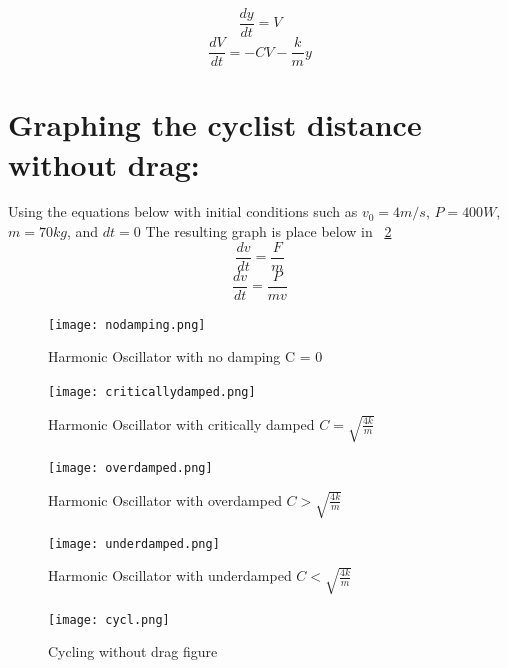 \documentclass{article}
\begin{document}
$$\frac{dy}{dt}=V$$
$$\frac{dV}{dt}=-CV-\frac{k}{m}y$$

\section{Graphing the cyclist distance without drag:}
\label{intro}
Using the equations below with initial conditions such as $v_0=4m/s$, $P = 400W$, $m = 70kg$, and $dt = 0$ The resulting graph is place below in \figurename~\ref{fig:cycl_plot} 
$$\frac{dv}{dt}=\frac{F}{m}$$
$$\frac{dv}{dt}=\frac{P}{mv}$$


\begin{figure}[h]
    \centering
    \texttt{[image: nodamping.png]}  %
    \caption{Harmonic Oscillator with no damping C = 0}
    \label{fig:nodamp_plot}
    \centering
    \texttt{[image: criticallydamped.png]}  %
    \caption{Harmonic Oscillator with critically damped $C = \sqrt{\frac{4k}{m}}$ }
    \label{fig:crit_plot}
    \centering
    \texttt{[image: overdamped.png]}  %
    \caption{Harmonic Oscillator with overdamped $C > \sqrt{\frac{4k}{m}}$}
    \label{fig:over_plot}
    \centering
    \texttt{[image: underdamped.png]}  %
    \caption{Harmonic Oscillator with underdamped $C < \sqrt{\frac{4k}{m}}$}
    \label{fig:under_plot}
\end{figure}


\begin{figure}[h]
    \centering
    \texttt{[image: cycl.png]}  %
    \caption{Cycling without drag figure}
    \label{fig:cycl_plot}
\end{figure}
\end{document}
